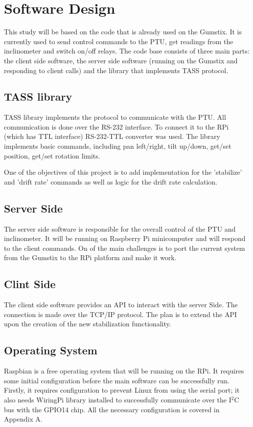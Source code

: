 \section{Software Design}
This study will be based on the code that is already used on the Gumstix. It is currently used to send control commands to the PTU, get readings from the inclinometer and switch on/off relays. The code base consists of three main parts: the client side software, the server side software (running on the Gumstix and responding to client calls) and the library that implements TASS protocol. 

\subsection{TASS library}
TASS library implements the protocol to communicate with the PTU. All communication is done over the RS-232 interface. To connect it to the RPi (which has TTL interface) RS-232-TTL converter was used. The library implements basic commands, including pan left/right, tilt up/down, get/set position, get/set rotation limits.

One of the objectives of this project is to add implementation for the 'stabilize' and 'drift rate' commands as well as logic for the drift rate calculation.

\subsection{Server Side}
The server side software is responsible for the overall control of the PTU and inclinometer. It will be running on Raspberry Pi minicomputer and will respond to the client commands. On of the main challenges is to port the current system from the Gumstix to the RPi platform and make it work.

\subsection{Clint Side}
The client side software provides an API to interact with the server Side. The connection is made over the TCP/IP protocol. The plan is to extend the API upon the creation of the new stabilization functionality. 

\subsection{Operating System}
Raspbian is a free operating system that will be running on the RPi. It requires some initial configuration before the main software can be successfully run. Firstly, it requires configuration to prevent Linux from using the serial port; it also needs WiringPi library \cite{WiringPi} installed to successfully communicate over the I$^2$C bus with the GPIO14 chip. All the necessary configuration is covered in Appendix A.  

